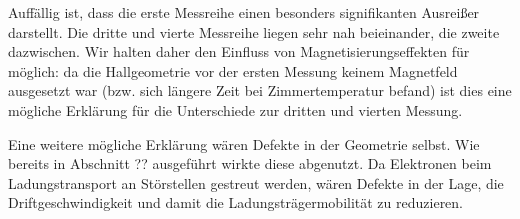Auffällig ist, dass die erste Messreihe einen besonders signifikanten Ausreißer darstellt. Die dritte und vierte Messreihe liegen sehr nah beieinander, die zweite dazwischen. Wir halten daher den Einfluss von Magnetisierungseffekten für möglich: da die Hallgeometrie vor der ersten Messung keinem Magnetfeld ausgesetzt war (bzw. sich längere Zeit bei Zimmertemperatur befand) ist dies eine mögliche Erklärung für die Unterschiede zur dritten und vierten Messung. 

Eine weitere mögliche Erklärung wären Defekte in der Geometrie selbst. Wie bereits in Abschnitt ?? ausgeführt wirkte diese abgenutzt. Da Elektronen beim Ladungstransport an Störstellen gestreut werden, wären Defekte in der Lage, die Driftgeschwindigkeit und damit die Ladungsträgermobilität zu reduzieren. 
